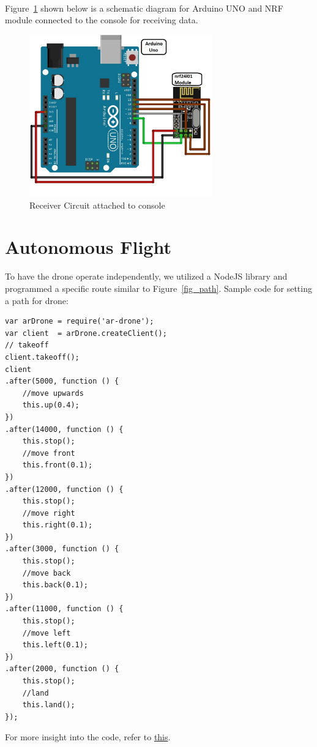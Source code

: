 \documentclass[
  journal=largetwo,
  manuscript=article-type,
  year=2023,
  volume=1,
]{iitp-journal}
\begin{document}
\\
Figure~\ref{fig:receiver} shown below is a schematic diagram for Arduino UNO and NRF module connected to the console for receiving data. 
\begin{figure}[h]
    \centering
    \includegraphics[width=0.7\textwidth]{Receiver_circuit.jpg}
    \caption{Receiver Circuit attached to console}
    \label{fig:receiver}
\end{figure}

\section{Autonomous Flight}
To have the drone operate independently, we utilized a NodeJS library and programmed a specific route similar to Figure~\ref{fig_path}.
Sample code for setting a path for drone:
\begin{verbatim}
var arDrone = require('ar-drone');
var client  = arDrone.createClient();
// takeoff
client.takeoff();
client
.after(5000, function () {
    //move upwards
    this.up(0.4);
})
.after(14000, function () {
    this.stop();
    //move front
    this.front(0.1);
})
.after(12000, function () {
    this.stop();
    //move right
    this.right(0.1);
})
.after(3000, function () {
    this.stop();
    //move back
    this.back(0.1);
})
.after(11000, function () {
    this.stop();
    //move left
    this.left(0.1);
})
.after(2000, function () {
    this.stop();
    //land
    this.land();
});
\end{verbatim}
For more insight into the code, refer to  \href{https://github.com/KartuzGupta/Parrot-AR-Drone/blob/main/README.md}{this}.
\end{document}
